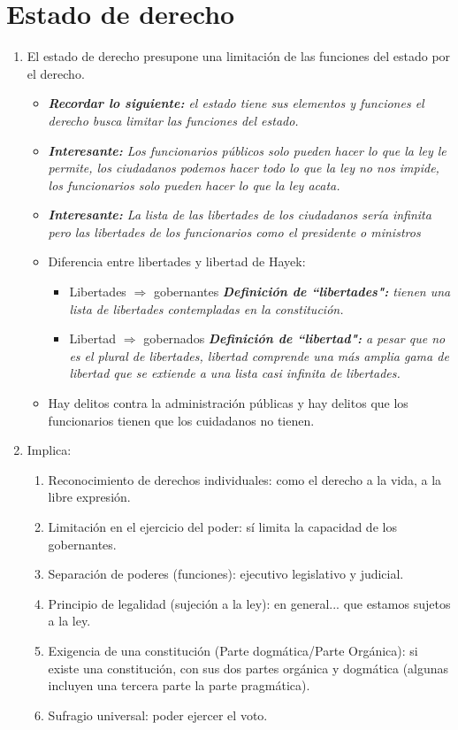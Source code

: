 \section{Estado de derecho}
\begin{enumerate}
    \item El estado de derecho presupone una limitación de las funciones del estado por el derecho.
    \begin{itemize}
        \item \emph{\textbf{Recordar lo siguiente: }el estado tiene sus elementos y funciones el derecho busca limitar las funciones del estado.}
        \item \emph{\textbf{Interesante:} Los funcionarios públicos solo pueden hacer lo que la ley le permite, los ciudadanos podemos hacer todo lo que la ley no nos impide, los funcionarios solo pueden hacer lo que la ley acata.}
        \item \emph{\textbf{Interesante:} La lista de las libertades de los ciudadanos sería infinita pero las libertades de los funcionarios como el presidente o ministros }
        \item Diferencia entre libertades y libertad de Hayek: 
            \begin{itemize}
                \item Libertades $\Rightarrow$ gobernantes \emph{\textbf{Definición de ``libertades":} tienen una lista de libertades contempladas en la constitución.}
                \item Libertad $\Rightarrow$ gobernados \emph{\textbf{Definición de ``libertad":} a pesar que no es el plural de libertades, libertad comprende una más amplia gama de libertad que se extiende a una lista casi infinita de libertades. }
            \end{itemize}
        \item Hay delitos contra la administración públicas y hay delitos que los funcionarios tienen que los cuidadanos no tienen.
    \end{itemize}
    \item Implica:
        \begin{enumerate}
            \item Reconocimiento de derechos individuales: como el derecho a la vida, a la libre expresión.
            \item Limitación en el ejercicio del poder: sí limita la capacidad de los gobernantes. 
            \item Separación de poderes (funciones): ejecutivo legislativo y judicial.
            \item Principio de legalidad (sujeción a la ley): en general... que estamos sujetos a la ley.
            \item Exigencia de una constitución (Parte dogmática/Parte Orgánica): si existe una constitución, con sus dos partes orgánica y dogmática (algunas incluyen una tercera parte la parte pragmática).
            \item Sufragio universal: poder ejercer el voto. 
        \end{enumerate}
    

\end{enumerate}
